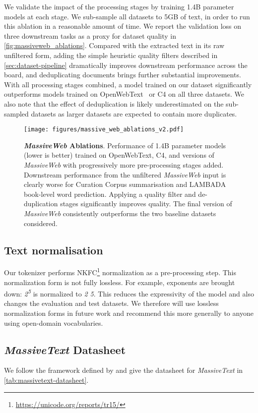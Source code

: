 \documentclass[11pt, a4paper, logo, internal, copyright, nonumbering]{deepmind}
\newcommand{\massivetext}{\textit{MassiveText}\xspace}
\newcommand{\massiveweb}{\textit{MassiveWeb}\xspace}
\begin{document}
We validate the impact of the processing stages by training 1.4B parameter models at each stage. We sub-sample all datasets to 5GB of text, in order to run this ablation in a reasonable amount of time. 
We report the validation loss on three downstream tasks as a proxy for dataset quality in \autoref{fig:massiveweb_ablations}.
Compared with the extracted text in its raw unfiltered form, adding the simple heuristic quality filters described in \autoref{sec:dataset-pipeline} dramatically improves downstream performance across the board, and deduplicating documents brings further substantial improvements. 
With all processing stages combined, a model trained on our dataset significantly outperforms models trained on OpenWebText~\citep{radford2018improving} or C4 on all three datasets.
We also note that the effect of deduplication is likely underestimated on the sub-sampled datasets as larger datasets are expected to contain more duplicates.

\begin{figure}[H]
    \centering
    \texttt{[image: figures/massive\_web\_ablations\_v2.pdf]}
    \caption{\textbf{\massiveweb Ablations}. Performance of 1.4B parameter models (lower is better) trained on OpenWebText, C4, and versions of \massiveweb with progressively more pre-processing stages added. Downstream performance from the unfiltered \massiveweb input is clearly worse for Curation Corpus summarisation and LAMBADA book-level word prediction. Applying a quality filter and de-duplication stages significantly improves quality. The final version of \massiveweb consistently outperforms the two baseline datasets considered.}
    \label{fig:massiveweb_ablations}
\end{figure}

\subsection{Text normalisation}
Our tokenizer performs NKFC\footnote{\url{https://unicode.org/reports/tr15/}} normalization as a pre-processing step. This normalization form is not fully lossless. For example, exponents are brought down:  \textit{2\textsuperscript{5}} is normalized to \textit{2 5}. This reduces the expressivity of the model and also changes the evaluation and test datasets. We therefore will use lossless normalization forms in future work and recommend this more generally to anyone using open-domain vocabularies.

\subsection{\massivetext Datasheet}
\label{appendix:massivetext-datasheet}
We follow the framework defined by \citet{gebru2018datasheets} and give the datasheet for \massivetext in \autoref{tab:massivetext-datasheet}.
\end{document}
